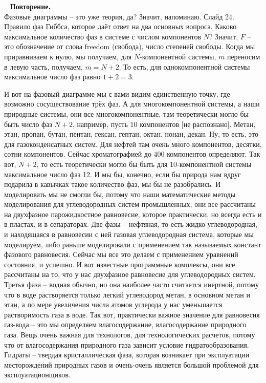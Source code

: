 \documentclass[main.tex]{subfiles}
\begin{document}
\ \newline
\textbf{Повторение.}\\
Фазовые диаграммы -- это уже теория, да?
Значит, напоминаю.
Слайд 24.
Правило фаз Гиббса, которое даёт ответ на два основных вопроса.
Каково максимальное количество фаз в системе с числом компонентов $N$?
Значит, $F$ -- это обозначение от слова freedom (свобода), число степеней свободы.
Когда мы приравниваем к нулю, мы получаем, для $N$-компонентной системы, $m$ переносим в левую часть, получаем, $m=N+2$.
То есть, для однокомпонентной системы максимальное число фаз равно $1+2=3$.

И вот на фазовый диаграмме мы с вами видим единственную точку, где возможно сосуществование трёх фаз.
А для многокомпонентной системы, а наши природные системы, они все многокомпонентные, там теоретически могло бы быть число фаз $N+2$, например, пусть 10 компонентов [не распознано].
Метан, этан, пропан, бутан, пентан, гексан, гептан, октан, нонан, декан.
Ну, то есть, это для газоконденсатных систем.
Для нефтей там очень много компонентов, десятки, сотни компонентов.
Сейчас хроматографией до 400 компонентов определяют.
Так вот, $N+2$, то есть теоретически могло бы быть для 10-компонентной системы максимальное число фаз 12.
И мы бы, конечно, если бы природа нам вдруг подарила в кавычках такое количество фаз, мы бы не разобрались.
И моделировать мы не смогли бы, потому что наши математические методы моделирования для углеводородных систем промышленных, они все рассчитаны на двухфазное парожидкостное равновесие, которое практически, но всегда есть и в пластах, и в сепараторах.
Две фазы -- нефтяная, то есть жидко-углеводородная, и находящаяся в равновесии с ней газовая углеводородная система, которые мы моделируем, либо раньше моделировали с применением так называемых констант фазового равновесия.
Сейчас мы все это делаем с применением уравнений состояния, и успешно.
И вот известные программные комплексы, они все рассчитаны на то, что у нас двухфазное равновесие для углеводородных систем.
Третья фаза -- водная обычно, но она наиболее часто считается инертной, потому что в воде растворяется только легкий углеводород метан, в основном метан и этан, а по мере увеличения числа атомов углерода у нас уменьшается растворимость газа в воде.
Так вот, практически важное значение для равновесия газ-вода -- это мы определяем влагосодержание, влагосодержание природного газа.
Вещь очень важная для технологов, для технологических расчетов, потому что от влагосодержания природного газа зависит условие гидратообразования.
Гидраты -- твердая кристаллическая фаза, которая возникает при эксплуатации месторождений природных газов и очень-очень является большой проблемой для эксплуатационщиков.
\end{document}
